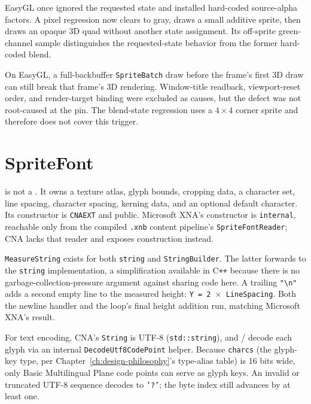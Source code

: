 \begin{historynote}
EasyGL once ignored the requested state and installed hard-coded source-alpha factors. A pixel
regression now clears to gray, draws a small additive sprite, then draws an opaque 3D quad without
another state assignment. Its off-sprite green-channel sample distinguishes the requested-state
behavior from the former hard-coded blend.
\end{historynote}

\begin{limitationnote}
On EasyGL, a full-backbuffer \texttt{SpriteBatch} draw before the frame's first 3D draw can still
break that frame's 3D rendering. Window-title readback, viewport-reset order, and render-target
binding were excluded as causes, but the defect was not root-caused at the pin. The blend-state
regression uses a $4\times4$ corner sprite and therefore does not cover this trigger.
\end{limitationnote}

\section{SpriteFont}
\label{sec:spritefont-measure}

 is not a . It owns a texture atlas,
glyph bounds, cropping data, a character set, line spacing, character spacing, kerning data,
and an optional default character. Its constructor is \texttt{CNAEXT} and public. Microsoft XNA's
 constructor is \texttt{internal}, reachable only from the compiled
\texttt{.xnb} content pipeline's \texttt{SpriteFontReader}; CNA lacks that reader and exposes
construction instead.

\texttt{MeasureString} exists for both \texttt{string} and \texttt{StringBuilder}. The latter
forwards to the \texttt{string} implementation, a simplification available in C\texttt{++}
because there is no garbage-collection-pressure argument against sharing
code here. A trailing \texttt{"\textbackslash n"} adds a second empty line to the measured
height: \texttt{Y = 2 \(\times\) LineSpacing}. Both the newline handler and the loop's final
height addition run, matching Microsoft XNA's result.

For text encoding, CNA's \texttt{String} is UTF-8
(\texttt{std::string}), and  /  decode each glyph via
an internal \texttt{DecodeUtf8CodePoint} helper. Because \texttt{charcs} (the glyph-key type,
per Chapter~\ref{ch:design-philosophy}'s type-alias table) is 16 bits wide, only Basic
Multilingual Plane code points can serve as glyph keys. An invalid or truncated UTF-8 sequence
decodes to \texttt{'?'}; the byte index still advances by at least one.

